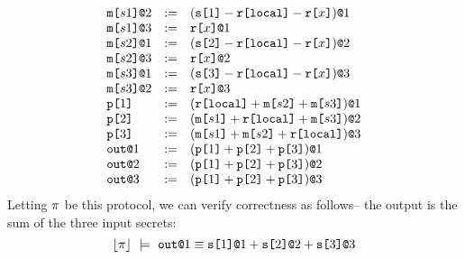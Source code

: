 $$
\begin{array}{lll}
  \elab{\mesg{s1}}{2} &:=& \elab{(\secret{1} \fminus \locflip \fminus \flip{x})}{1} \\ 
  \elab{\mesg{s1}}{3} &:=& \elab{\flip{x}}{1} \\ 
  \elab{\mesg{s2}}{1} &:=& \elab{(\secret{2} \fminus \locflip \fminus \flip{x})}{2} \\ 
  \elab{\mesg{s2}}{3} &:=& \elab{\flip{x}}{2} \\ 
  \elab{\mesg{s3}}{1} &:=& \elab{(\secret{3} \fminus \locflip \fminus \flip{x})}{3} \\ 
  \elab{\mesg{s3}}{2} &:=& \elab{\flip{x}}{3}\\
  \rvl{1} &:=& \elab{(\locflip \fplus \mesg{s2} \fplus \mesg{s3})}{1} \\ 
  \rvl{2} &:=& \elab{(\mesg{s1} \fplus \locflip \fplus \mesg{s3})}{2} \\
  \rvl{3} &:=& \elab{(\mesg{s1} \fplus \mesg{s2} \fplus \locflip)}{3} \\
  \out{1} &:=& \elab{(\rvl{1} \fplus \rvl{2} + \rvl{3})}{1}\\
  \out{2} &:=& \elab{(\rvl{1} \fplus \rvl{2} + \rvl{3})}{2}\\
  \out{3} &:=& \elab{(\rvl{1} \fplus \rvl{2} + \rvl{3})}{3}
\end{array}
$$
Letting $\prog$ be this protocol, we can verify correctness
as follows-- the output is the sum of the three input secrets:
$$
\toeq{\prog}\ \models\ \out{1} \eop \sx{1}{1} \fplus \sx{2}{2} \fplus \sx{3}{3}
$$

